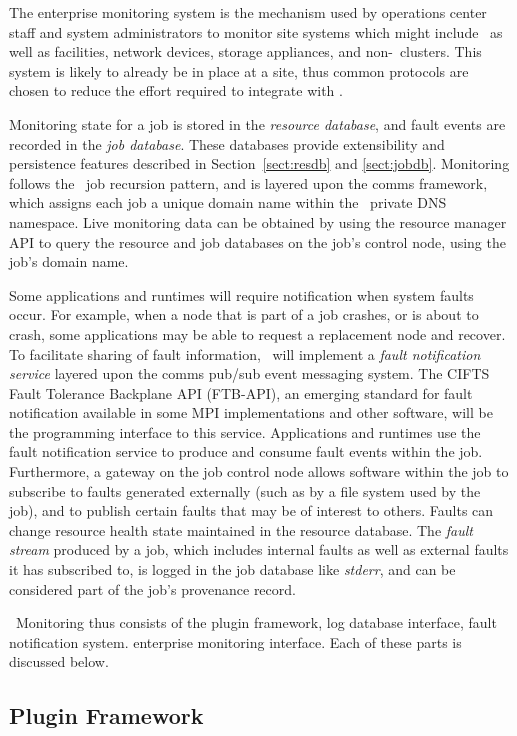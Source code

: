The enterprise monitoring system is the mechanism used by operations center
staff and system administrators to monitor site systems which might include
\ngrm\ as well as facilities, network devices, storage appliances,
and non-\ngrm\ clusters.
This system is likely to already be in place at a site, thus common
protocols are chosen to reduce the effort required to integrate with \ngrm.

Monitoring state for a job is stored in the {\em resource database}, and
fault events are recorded in the {\em job database}.
These databases provide extensibility and persistence features described
in Section~\ref{sect:resdb} and \ref{sect:jobdb}.
Monitoring follows the \ngrm\ job recursion pattern, and is layered upon
the comms framework, which assigns each job a unique domain name within
the \ngrm\ private DNS namespace.
Live monitoring data can be obtained by using the resource
manager API to query the resource and job databases on the job's control
node, using the job's domain name.

Some applications and runtimes will require notification when system faults
occur.  For example, when a node that is part of a job crashes, or is about to
crash, some applications may be able to request a replacement node and recover.
To facilitate sharing of fault information, \ngrm\ will implement a
{\em fault notification service} layered upon the comms pub/sub event
messaging system.
The CIFTS Fault Tolerance Backplane API\cite{FTBAPI} (FTB-API), an emerging
standard for fault notification available in some MPI implementations and
other software, will be the programming interface to this service.
Applications and runtimes use the fault notification service to produce
and consume fault events within the job.  Furthermore, a gateway on the
job control node allows software within the job to subscribe to faults
generated externally (such as by a file system used by the job), and to
publish certain faults that may be of interest to others.
Faults can change resource health state maintained in the resource database.
The {\em fault stream} produced by a job, which includes internal faults
as well as external faults it has subscribed to, is logged in the job database
like {\em stderr}, and can be considered part of the job's provenance record.

\ngrm\ Monitoring thus consists of
the plugin framework, 
log database interface,
fault notification system.
enterprise monitoring interface.
Each of these parts is discussed below.

\subsection{Plugin Framework}

